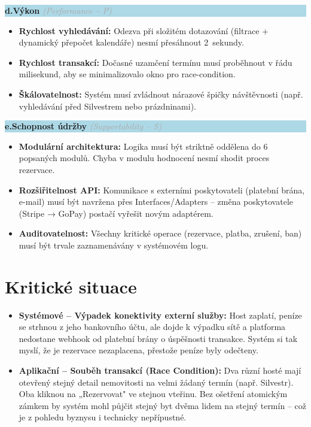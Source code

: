 \documentclass[11pt, a4paper]{article}
\newcommand{\furpssec}[2]{%
  \vspace{0.45cm}%
  \noindent\colorbox{lightblue}{%
    \parbox{\dimexpr\textwidth-2\fboxsep\relax}{%
      \vspace{3pt}\hspace{4pt}%
      \textbf{\textcolor{mainblue}{#1}}\enskip%
      {\small\textcolor{darkgray}{\textit{(#2)}}}%
      \hspace{4pt}\vspace{3pt}%
    }%
  }\par\vspace{0.25cm}%
}
\begin{document}
\furpssec{d.\enspace Výkon}{Performance -- P}
\begin{itemize}
  \item \textbf{Rychlost vyhledávání:} Odezva při složitém dotazování (filtrace + dynamický přepočet kalendáře) nesmí přesáhnout 2~sekundy.
  \item \textbf{Rychlost transakcí:} Dočasné uzamčení termínu musí proběhnout v řádu milisekund, aby se minimalizovalo okno pro race-condition.
  \item \textbf{Škálovatelnost:} Systém musí zvládnout nárazové špičky návštěvnosti (např. vyhledávání před Silvestrem nebo prázdninami).
\end{itemize}

\furpssec{e.\enspace Schopnost údržby}{Supportability -- S}
\begin{itemize}
  \item \textbf{Modulární architektura:} Logika musí být striktně oddělena do 6 popsaných modulů. Chyba v modulu hodnocení nesmí shodit proces rezervace.
  \item \textbf{Rozšiřitelnost API:} Komunikace s externími poskytovateli (platební brána, e-mail) musí být navržena přes Interfaces/Adapters -- změna poskytovatele (Stripe → GoPay) postačí vyřešit novým adaptérem.
  \item \textbf{Auditovatelnost:} Všechny kritické operace (rezervace, platba, zrušení, ban) musí být trvale zaznamenávány v systémovém logu.
\end{itemize}

\section{Kritické situace}

\begin{itemize}
  \item \textbf{Systémové -- Výpadek konektivity externí služby:}
    Host zaplatí, peníze se strhnou z jeho bankovního účtu, ale dojde k výpadku sítě a platforma nedostane webhook od platební brány o úspěšnosti transakce. Systém si tak myslí, že je rezervace nezaplacena, přestože peníze byly odečteny.

  \item \textbf{Aplikační -- Souběh transakcí (Race Condition):}
    Dva různí hosté mají otevřený stejný detail nemovitosti na velmi žádaný termín (např. Silvestr). Oba kliknou na „Rezervovat" ve stejnou vteřinu. Bez ošetření atomickým zámkem by systém mohl půjčit stejný byt dvěma lidem na stejný termín -- což je z pohledu byznysu i technicky nepřípustné.
\end{itemize}
\end{document}
